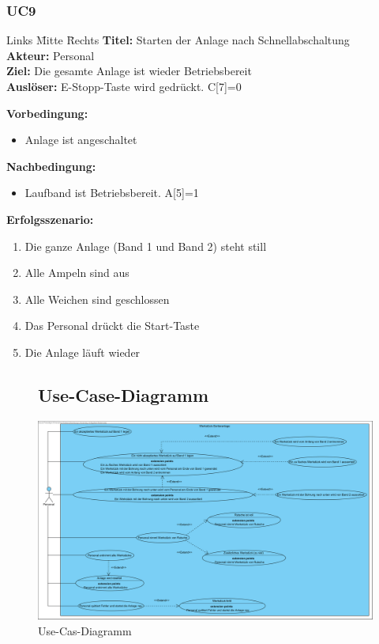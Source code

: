 \documentclass[oneside,a4paper,titlepage]{scrartcl} %
\begin{document}
\subsubsection{UC9}
\begin{tabbing}
 Links \= Mitte \= Rechts \kill
 \textbf{Titel:} \> \> Starten der Anlage nach Schnellabschaltung\\
 \textbf{Akteur:} \> \> Personal\\
 \textbf{Ziel:} \> \> Die gesamte Anlage ist wieder Betriebsbereit\\
 \textbf{Auslöser:} \> \> E-Stopp-Taste wird gedrückt. C[7]=0\\
\end{tabbing}
\textbf{Vorbedingung:}
\begin{itemize}
 \item Anlage ist angeschaltet
\end{itemize}
\textbf{Nachbedingung:}
\begin{itemize}
 \item Laufband ist Betriebsbereit. A[5]=1
\end{itemize}
\textbf{Erfolgsszenario:}
\begin{enumerate}
 \item Die ganze Anlage (Band 1 und Band 2) steht still
 \item Alle Ampeln sind aus
 \item Alle Weichen sind geschlossen
 \item Das Personal drückt die Start-Taste
 \item Die Anlage läuft wieder
\end{enumerate}

\begin{figure}
 \subsection{Use-Case-Diagramm}
 \centering\vfill\includegraphics[angle=90,scale=0.6]{imgs/UseCases.png}
 \caption{Use-Cas-Diagramm}
\end{figure}
\end{document}
